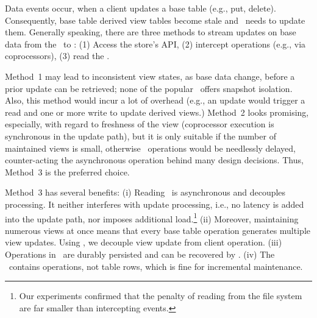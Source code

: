 Data events occur, when a client updates a base table (e.g., put,
delete). Consequently, base table derived view tables become stale and
\VMS\ needs to update them. Generally speaking, there are three
methods to stream updates on base data from the \KVS\ to \VMS: (1)
Access the store's API, (2) intercept operations (e.g., via
coprocessors), (3) read the \TL.

Method~1 may lead to inconsistent view states, as base data 
change, before a prior update can be retrieved; none of the popular
\KVSs\ offers snapshot isolation. Also, this method would incur a lot
of overhead (e.g., an update would trigger a read and one or more
write to update derived views.)  Method~2 looks promising, especially,
with regard to freshness of the view (coprocessor execution is
synchronous in the update path), but it is only suitable if the number
of maintained views is small, otherwise \KVS\ operations would be
needlessly delayed, counter-acting the asynchronous operation behind
many design decisions. Thus, Method~3 is the preferred choice.

Method~3 has several benefits: (i) Reading \TL\ is asynchronous and
decouples processing. It neither interferes with update processing,
i.e., no latency is added into the update path, nor imposes additional
load.\footnote{Our experiments confirmed that the penalty of reading
  from the file system are far smaller than intercepting events.} (ii)
Moreover, maintaining numerous views at once means that every base
table operation generates multiple view updates. Using \TL, we
decouple view update from client operation. (iii) Operations in
\TL\ are durably persisted and can be recovered by \VMS. (iv) The 
\TL\ contains operations, not table rows, which is fine for 
incremental maintenance.




%
